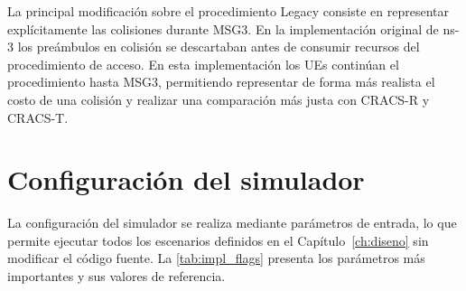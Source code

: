 La principal modificación sobre el procedimiento Legacy consiste en representar explícitamente las colisiones durante MSG3. En la implementación original de ns-3 los preámbulos en colisión se descartaban antes de consumir recursos del procedimiento de acceso. En esta implementación los UEs continúan el procedimiento hasta MSG3, permitiendo representar de forma más realista el costo de una colisión y realizar una comparación más justa con CRACS-R y CRACS-T.

\section{Configuración del simulador}
\label{sec:impl_config}
La configuración del simulador se realiza mediante parámetros de entrada, lo que permite ejecutar todos los escenarios definidos en el Capítulo~\ref{ch:diseno} sin modificar el código fuente. La \cref{tab:impl_flags} presenta los parámetros más importantes y sus valores de referencia.

